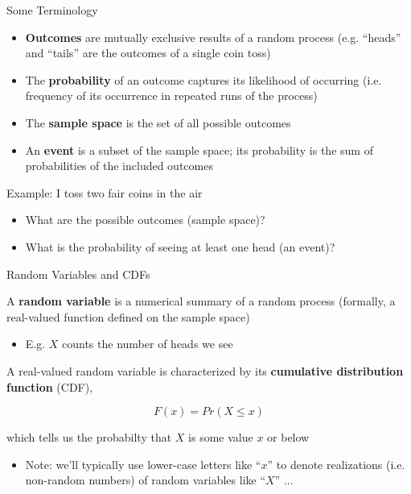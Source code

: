 \documentclass[11pt,english,handout]{beamer}
\newenvironment{wideitemize}{\itemize\addtolength{\itemsep}{10pt}}{\enditemize}
\begin{document}
\begin{frame}{Some Terminology}

\begin{itemize}
\item \textbf{Outcomes} are mutually exclusive results of a random process (e.g. ``heads'' and ``tails'' are the outcomes of a single coin toss)
\vspace{0.1cm}\pause{}
\item The \textbf{probability} of an outcome captures its likelihood of occurring (i.e. frequency of its occurrence in repeated runs of the process)
\vspace{0.1cm}\pause{}
\item The \textbf{sample space} is the set of all possible outcomes
\vspace{0.1cm}\pause{}
\item An \textbf{event} is a subset of the sample space; its probability is the sum of probabilities of the included outcomes
\end{itemize}
\vspace{0.4cm}
\pause{}
Example: I toss two fair coins in the air\pause{}

\begin{itemize}
\item What are the possible outcomes (sample space)?
\vspace{0.1cm}\pause{}
\item What is the probability of seeing at least one head (an event)?
\end{itemize}

\end{frame}

\begin{frame}{Random Variables and CDFs}
\begin{wideitemize}
\item
A \textbf{random variable} is a numerical summary of a random process (formally, a real-valued function defined on the sample space)

\begin{itemize}
\item E.g. $X$ counts the number of heads we see 
\end{itemize}
\pause{}

\item A real-valued random variable is characterized by its \textbf{cumulative distribution function} (CDF), 

$$F(x) = Pr( X \leq x ) $$

\noindent which tells us the probabilty that $X$ is some value $x$ or below
\medskip\pause{}
\begin{itemize}
\item Note: we'll typically use lower-case letters like ``$x$'' to denote realizations (i.e. non-random numbers) of random variables like ``$X$'' ...
\end{itemize}

\end{wideitemize}
\end{frame} 
\end{document}
